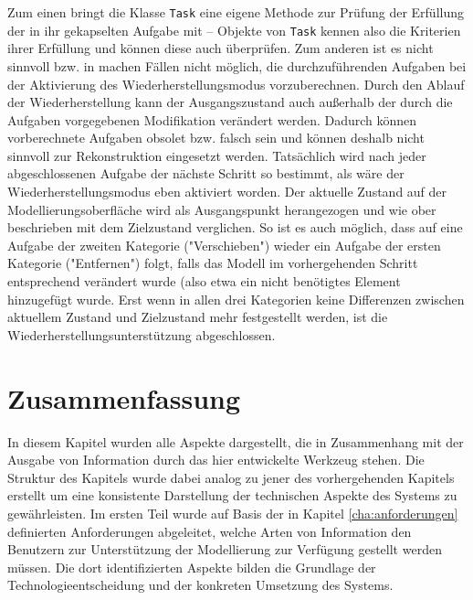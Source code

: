 Zum einen bringt die Klasse \texttt{Task} eine eigene Methode zur Prüfung der Erfüllung der in ihr gekapselten Aufgabe mit -- Objekte von \texttt{Task} kennen also die Kriterien ihrer Erfüllung und können diese auch überprüfen. Zum anderen ist es nicht sinnvoll bzw. in machen Fällen nicht möglich, die durchzuführenden Aufgaben bei der Aktivierung des Wiederherstellungsmodus vorzuberechnen. Durch den Ablauf der Wiederherstellung kann der Ausgangszustand auch außerhalb der durch die Aufgaben vorgegebenen Modifikation verändert werden. Dadurch können vorberechnete Aufgaben obsolet bzw. falsch sein und können deshalb nicht sinnvoll zur Rekonstruktion eingesetzt werden. Tatsächlich wird nach jeder abgeschlossenen Aufgabe der nächste Schritt so bestimmt, als wäre der Wiederherstellungsmodus eben aktiviert worden. Der aktuelle Zustand auf der Modellierungsoberfläche wird als Ausgangspunkt herangezogen und wie ober beschrieben mit dem Zielzustand verglichen. So ist es auch möglich, dass auf eine Aufgabe der zweiten Kategorie ("Verschieben") wieder ein Aufgabe der ersten Kategorie ("Entfernen") folgt, falls das Modell im vorhergehenden Schritt entsprechend verändert wurde (also etwa ein nicht benötigtes Element hinzugefügt wurde. Erst wenn in allen drei Kategorien keine Differenzen zwischen aktuellem Zustand und Zielzustand mehr festgestellt werden, ist die Wiederherstellungsunterstützung abgeschlossen.


\section{Zusammenfassung} %
\label{sec:output_zusammenfassung}

In diesem Kapitel wurden alle Aspekte dargestellt, die in Zusammenhang mit der Ausgabe von Information durch das hier entwickelte Werkzeug stehen. Die Struktur des Kapitels wurde dabei analog zu jener des vorhergehenden Kapitels erstellt um eine konsistente Darstellung der technischen Aspekte des Systems zu gewährleisten. Im ersten Teil wurde auf Basis der in Kapitel \ref{cha:anforderungen} definierten Anforderungen abgeleitet, welche Arten von Information den Benutzern zur Unterstützung der Modellierung zur Verfügung gestellt werden müssen. Die dort identifizierten Aspekte bilden die Grundlage der Technologieentscheidung und der konkreten Umsetzung des Systems.

